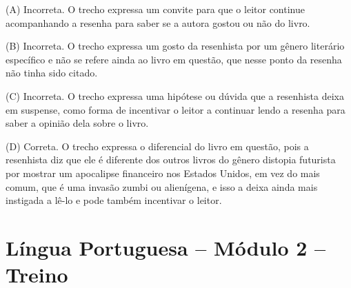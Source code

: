 \begin{enumerate}
(A) Incorreta. O trecho expressa um convite para que o leitor continue
acompanhando a resenha para saber se a autora gostou ou não do livro.

(B) Incorreta. O trecho expressa um gosto da resenhista por um gênero
literário específico e não se refere ainda ao livro em questão, que
nesse ponto da resenha não tinha sido citado. 

(C) Incorreta. O trecho
expressa uma hipótese ou dúvida que a resenhista deixa em suspense, como
forma de incentivar o leitor a continuar lendo a resenha para saber a
opinião dela sobre o livro. 

(D) Correta. O trecho expressa o diferencial
do livro em questão, pois a resenhista diz que ele é diferente dos
outros livros do gênero distopia futurista por mostrar um apocalipse
financeiro nos Estados Unidos, em vez do mais comum, que é uma invasão
zumbi ou alienígena, e isso a deixa ainda mais instigada a lê-lo e pode
também incentivar o leitor.

\end{enumerate}

\section*{Língua Portuguesa – Módulo 2 – Treino}

